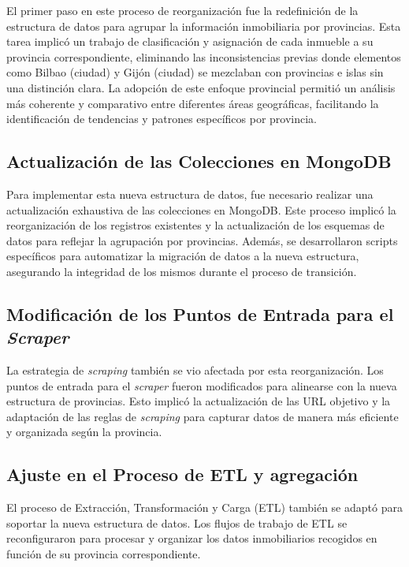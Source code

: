 El primer paso en este proceso de reorganización fue la redefinición de la estructura de datos para agrupar la información inmobiliaria por provincias. Esta tarea implicó un  trabajo de clasificación y asignación de cada inmueble a su provincia correspondiente, eliminando las inconsistencias previas donde elementos como Bilbao (ciudad) y Gijón (ciudad) se mezclaban con provincias e islas sin una distinción clara. La adopción de este enfoque provincial permitió un análisis más coherente y comparativo entre diferentes áreas geográficas, facilitando la identificación de tendencias y patrones específicos por provincia.

\subsection{Actualización de las Colecciones en MongoDB}

Para implementar esta nueva estructura de datos, fue necesario realizar una actualización exhaustiva de las colecciones en MongoDB. Este proceso implicó la reorganización de los registros existentes y la actualización de los esquemas de datos para reflejar la agrupación por provincias. Además, se desarrollaron scripts específicos para automatizar la migración de datos a la nueva estructura, asegurando la integridad de los mismos durante el proceso de transición.

\clearpage
\subsection{Modificación de los Puntos de Entrada para el \textit{Scraper}}

La estrategia de \textit{scraping} también se vio afectada por esta reorganización. Los puntos de entrada para el \textit{scraper} fueron modificados para alinearse con la nueva estructura de provincias. Esto implicó la actualización de las URL objetivo y la adaptación de las reglas de \textit{scraping} para capturar datos de manera más eficiente y organizada según la provincia.

\subsection{Ajuste en el Proceso de ETL y agregación}

El proceso de Extracción, Transformación y Carga (ETL) también se adaptó para soportar la nueva estructura de datos. Los flujos de trabajo de ETL se reconfiguraron para procesar y organizar los datos inmobiliarios recogidos en función de su provincia correspondiente. 

